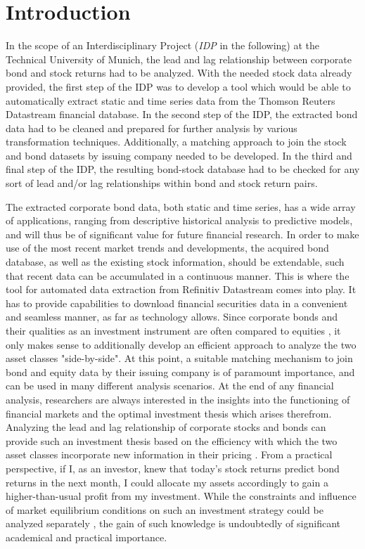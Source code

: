 \chapter{Introduction} \label{chapter:Introduction}
In the scope of an Interdisciplinary Project (\textit{IDP} in the following) at the Technical University of Munich, the lead and lag relationship between corporate bond and stock returns had to be analyzed. With the needed stock data already provided, the first step of the IDP was to develop a tool which would be able to automatically extract static and time series data from the Thomson Reuters Datastream financial database. In the second step of the IDP, the extracted bond data had to be cleaned and prepared for further analysis by various transformation techniques. Additionally, a matching approach to join the stock and bond datasets by issuing company needed to be developed. In the third and final step of the IDP, the resulting bond-stock database had to be checked for any sort of lead and/or lag relationships within bond and stock return pairs. 

The extracted corporate bond data, both static and time series, has a wide array of applications, ranging from descriptive historical analysis to predictive models, and will thus be of significant value for future financial research. In order to make use of the most recent market trends and developments, the acquired bond database, as well as the existing stock information, should be extendable, such that recent data can be accumulated in a continuous manner. This is where the tool for automated data extraction from Refinitiv Datastream comes into play. It has to provide capabilities to download financial securities data in a convenient and seamless manner, as far as technology allows. Since corporate bonds and their qualities as an investment instrument are often compared to equities \cite{asset-management}, it only makes sense to additionally develop an efficient approach to analyze the two asset classes "side-by-side". At this point, a suitable matching mechanism to join bond and equity data by their issuing company is of paramount importance, and can be used in many different analysis scenarios. At the end of any financial analysis, researchers are always interested in the insights into the functioning of financial markets and the optimal investment thesis which arises therefrom. Analyzing the lead and lag relationship of corporate stocks and bonds can provide such an investment thesis based on the efficiency with which the two asset classes incorporate new information in their pricing \cite{lead-lag-source}. From a practical perspective, if I, as an investor, knew that today's stock returns predict bond returns in the next month, I could allocate my assets accordingly to gain a higher-than-usual profit from my investment. While the constraints and influence of market equilibrium conditions on such an investment strategy could be analyzed separately \cite{asset-management}, the gain of such knowledge is undoubtedly of significant academical and practical importance. 


